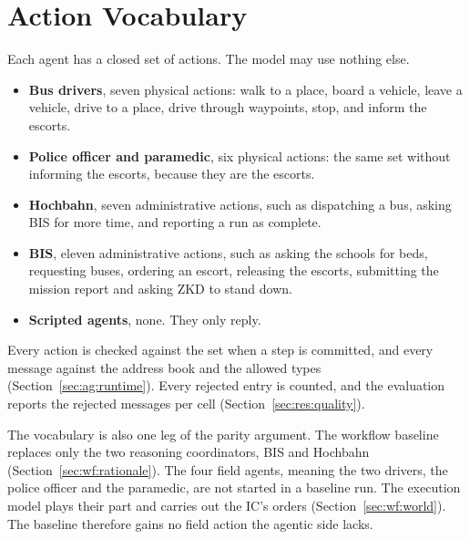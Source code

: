 \section{Action Vocabulary}
\label{sec:ag:actions}

Each agent has a closed set of actions. The model may use nothing else.
\begin{itemize}
  \item \textbf{Bus drivers}, seven physical actions: walk to a place, board a
  vehicle, leave a vehicle, drive to a place, drive through waypoints, stop,
  and inform the escorts.
  \item \textbf{Police officer and paramedic}, six physical actions: the same
  set without informing the escorts, because they are the escorts.
  \item \textbf{Hochbahn}, seven administrative actions, such as dispatching a
  bus, asking BIS for more time, and reporting a run as complete.
  \item \textbf{BIS}, eleven administrative actions, such as asking the schools
  for beds, requesting buses, ordering an escort, releasing the escorts,
  submitting the mission report and asking ZKD to stand down.
  \item \textbf{Scripted agents}, none. They only reply.
\end{itemize}
Every action is checked against the set when a step is committed, and every
message against the address book and the allowed types
(Section~\ref{sec:ag:runtime}). Every rejected entry is counted, and the
evaluation reports the rejected messages per cell
(Section~\ref{sec:res:quality}).

The vocabulary is also one leg of the parity argument. The workflow baseline
replaces only the two reasoning coordinators, BIS and Hochbahn
(Section~\ref{sec:wf:rationale}). The four field agents, meaning the two drivers,
the police officer and the paramedic, are not started in a baseline run. The
execution model plays their part and carries out the IC's orders
(Section~\ref{sec:wf:world}). The baseline therefore gains no field action the
agentic side lacks.
